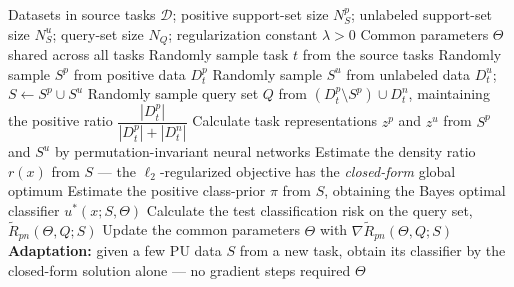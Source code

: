 \documentclass{article}
\begin{document}
\begin{algorithm}[!h]
\renewcommand{\algorithmicrequire}{\textbf{Input:}} %
\renewcommand{\algorithmicensure}{\textbf{Output:}} %
	\caption{Meta-learning for positive-unlabeled classification} %
	\begin{algorithmic}[1] %
	    \REQUIRE
	    Datasets in source tasks $\mathcal{D}$; positive support-set size $N_{S}^{p}$;
	    unlabeled support-set size $N_{S}^{u}$; query-set size $N_{Q}$;
	    regularization constant $\lambda>0$
	    \ENSURE
	    Common parameters $\Theta$ shared across all tasks
	    \STATE Randomly sample task $t$ from the source tasks
	    \STATE Randomly sample $S^{p}$ from positive data $D_{t}^{p}$
	    \STATE Randomly sample $S^{u}$ from unlabeled data $D_{t}^{u}$;\quad $S\leftarrow S^{p}\cup S^{u}$ %
	    \STATE Randomly sample query set $Q$ from $(D_{t}^{p}\setminus S^{p})\cup D_{t}^{n}$,
	    maintaining the positive ratio $\dfrac{|D_{t}^{p}|}{|D_{t}^{p}|+|D_{t}^{n}|}$ %
	    \STATE Calculate task representations $z^{p}$ and $z^{u}$ from $S^{p}$ and $S^{u}$ by
	    permutation-invariant neural networks %
	    \STATE Estimate the density ratio $r(x)$ from $S$ ---
	    the $\ell_{2}$-regularized objective has the \emph{closed-form} global optimum %
	    \STATE Estimate the positive class-prior $\pi$ from $S$, obtaining the Bayes optimal
	    classifier $u^{\ast}(x;S,\Theta)$
	    \STATE Calculate the test classification risk on the query set,
	    $\tilde{R}_{pn}(\Theta,Q;S)$
	    \STATE Update the common parameters $\Theta$ with $\nabla\tilde{R}_{pn}(\Theta,Q;S)$ %
	    \ENDWHILE
	    \STATE \textbf{Adaptation:} given a few PU data $S$ from a new task,
	    obtain its classifier by the closed-form solution alone --- no gradient steps required
		\RETURN $\Theta$
	\end{algorithmic}
\end{algorithm}
\end{document}
